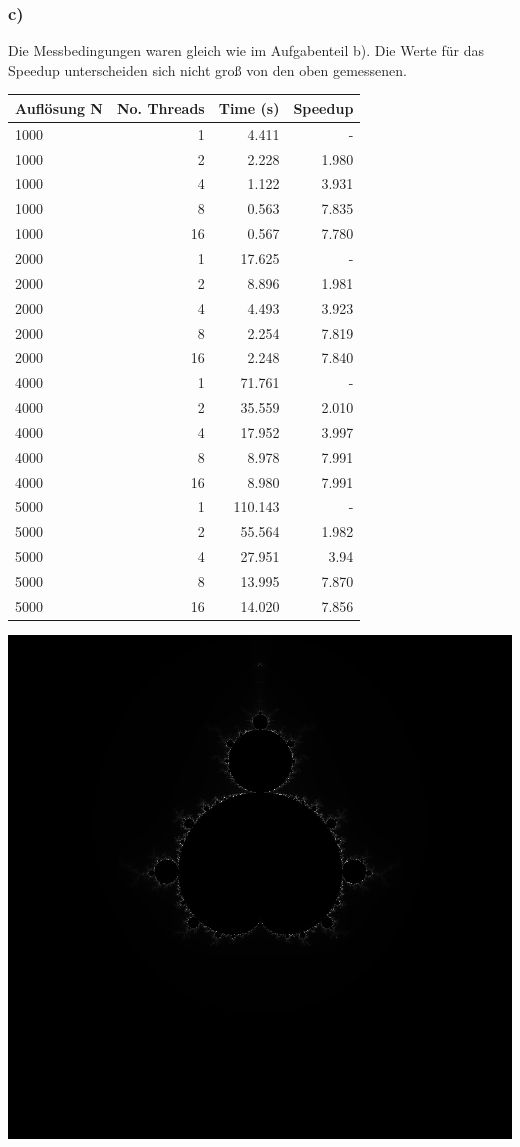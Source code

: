 \documentclass{report}
\begin{document}
	\newpage
        \subsubsection{c)}
        
        Die Messbedingungen waren gleich wie im Aufgabenteil b). Die Werte für das Speedup unterscheiden sich nicht groß von den oben gemessenen.\\
        
        \begin{tabular}{|l|r|r|r|}
        	\hline
        	 Auflösung N & No. Threads &  Time (s) & Speedup \\
        	 	\hline
        	 1000& 1 &  4.411 & - \\
        	 1000& 2 &  2.228 & 1.980 \\
        	 1000& 4 &  1.122 & 3.931 \\
        	 1000& 8 &  0.563 & 7.835\\
        	 1000& 16 &  0.567 & 7.780 \\
        	\hline
        	2000& 1 & 17.625 & - \\
        	2000& 2 &  8.896& 1.981 \\
        	2000& 4 &  4.493& 3.923 \\
        	2000& 8 &  2.254& 7.819 \\
        	2000& 16 &  2.248& 7.840 \\
        	\hline
        	4000& 1 & 71.761 & - \\
        	4000& 2 &  35.559 & 2.010 \\
        	4000& 4 &  17.952& 3.997 \\
        	4000& 8 &  8.978 & 7.991\\
        	4000& 16 &  8.980 & 7.991 \\
        	\hline
        	5000& 1 &  110.143 & - \\
        	5000& 2 &  55.564 & 1.982 \\
        	5000& 4 &  27.951 & 3.94 \\
        	5000& 8 &  13.995 & 7.870 \\
        	5000& 16 &  14.020 & 7.856\\
        	\hline
        \end{tabular}
	\begin{center}
		\includegraphics[width=0.6\linewidth]{Aufgaben-Ressourcen/normal-1000.jpg}	
	\end{center}
\end{document}
